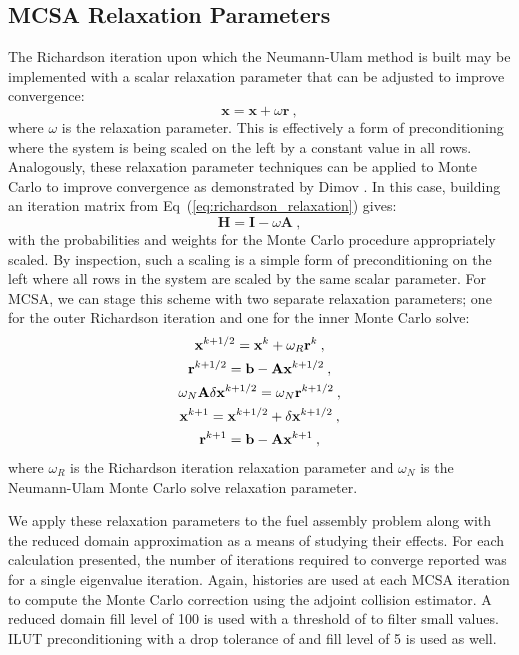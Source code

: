 \clearpage

\subsection{MCSA Relaxation Parameters}
\label{subsec:spn_mcsa_relaxation}
The Richardson iteration upon which the Neumann-Ulam method is built
may be implemented with a scalar relaxation parameter that can be
adjusted to improve convergence:
\begin{equation}
  \mathbf{x} = \mathbf{x} + \omega \mathbf{r}\:,
  \label{eq:richardson_relaxation}
\end{equation}
where $\omega$ is the relaxation parameter. This is effectively a form
of preconditioning where the system is being scaled on the left by a
constant value in all rows. Analogously, these relaxation parameter
techniques can be applied to Monte Carlo to improve convergence as
demonstrated by Dimov \citep{dimov_new_1998}. In this case, building
an iteration matrix from Eq~(\ref{eq:richardson_relaxation}) gives:
\begin{equation}
  \mathbf{H} = \mathbf{I} - \omega \mathbf{A}\:,
  \label{eq:relaxed_iteration_matrix}
\end{equation}
with the probabilities and weights for the Monte Carlo procedure
appropriately scaled. By inspection, such a scaling is a simple form
of preconditioning on the left where all rows in the system are scaled
by the same scalar parameter. For MCSA, we can stage this scheme with
two separate relaxation parameters; one for the outer Richardson
iteration and one for the inner Monte Carlo solve:
\begin{subequations}
  \begin{gather}
    \mathbf{x}^{k+1/2} = \mathbf{x}^k + \omega_R \mathbf{r}^k\:,\\ \mathbf{r}^{k+1/2}
    = \mathbf{b} -
    \mathbf{A}\mathbf{x}^{k+1/2}\:,\\ \omega_N\mathbf{A}\delta\mathbf{x}^{k+1/2} =
    \omega_N\mathbf{r}^{k+1/2}\:,\\ \mathbf{x}^{k+1} = \mathbf{x}^{k+1/2} + \delta
    \mathbf{x}^{k+1/2}\:,\\ \mathbf{r}^{k+1} = \mathbf{b} - \mathbf{A}\mathbf{x}^{k+1}\:,
  \end{gather}
  \label{eq:mcsa_relaxed}
\end{subequations}
where $\omega_R$ is the Richardson iteration relaxation parameter and
$\omega_N$ is the Neumann-Ulam Monte Carlo solve relaxation parameter.

We apply these relaxation parameters to the fuel assembly problem
along with the reduced domain approximation as a means of studying
their effects. For each calculation presented, the number of
iterations required to converge reported was for a single eigenvalue
iteration.  Again,  histories are used at each MCSA iteration
to compute the Monte Carlo correction using the adjoint collision
estimator. A reduced domain fill level of 100 is used with a threshold
of  to filter small values. ILUT preconditioning with a
drop tolerance of  and fill level of 5 is used as
well. 

